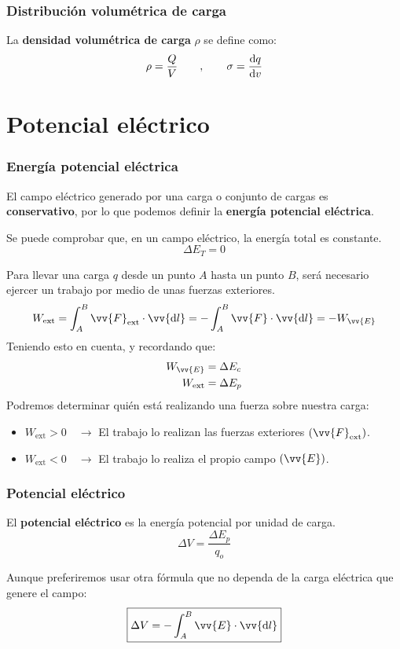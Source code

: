 \documentclass[a4paper]{book}
\numberwithin{figure}{chapter}
\numberwithin{equation}{chapter}
\newcommand{\subtext}[1]{_{\text{#1}}}
\renewcommand{\vec}[1]{\vv{{#1}}}
\begin{document}
\subsubsection{Distribución volumétrica de carga}
La \textbf{densidad volumétrica de carga} $\rho$ se define como:
\[\rho = \frac{Q}{V}\qquad ,\qquad \sigma = \dv{q}{v}\]

\section{Potencial eléctrico}
\subsubsection{Energía potencial eléctrica}
El campo eléctrico generado por una carga o conjunto de cargas es \textbf{conservativo}, por lo que podemos definir la \textbf{energía potencial eléctrica}.

Se puede comprobar que, en un campo eléctrico, la energía total es constante.
\[\Delta E_T = 0\]

Para llevar una carga $q$ desde un punto $A$ hasta un punto $B$, será necesario ejercer un trabajo por medio de unas fuerzas exteriores.
\[W\subtext{ext} = \int_A^B\vec{F}\subtext{ext}\cdot \vec{\dd l}=-\int_A^B\vec{F}\cdot \vec{\dd l}=-W_{\vec{E}}\]
Teniendo esto en cuenta, y recordando que:
\begin{align*}
	W_{\vec{E}}    & = \Delta E_c \\
	W\subtext{ext} & = \Delta E_p
\end{align*}
Podremos determinar quién está realizando una fuerza sobre nuestra carga:
\begin{itemize}
	\item $W\subtext{ext}>0\quad \longrightarrow $ El trabajo lo realizan las fuerzas exteriores $\left( \vec{F}\subtext{ext} \right)$.
	\item $W\subtext{ext}<0\quad \longrightarrow $ El trabajo lo realiza el propio campo $\left( \vec{E} \right)$.
\end{itemize}

\subsubsection{Potencial eléctrico}
El \textbf{potencial eléctrico} es la energía potencial por unidad de carga.
\[\Delta V = \frac{\Delta E_p}{q_o}\]

Aunque preferiremos usar otra fórmula que no dependa de la carga eléctrica que genere el campo:
\[\boxed{\Delta V = -\int_A^B\vec{E}\cdot \vec{\dd l}}\]
\end{document}
